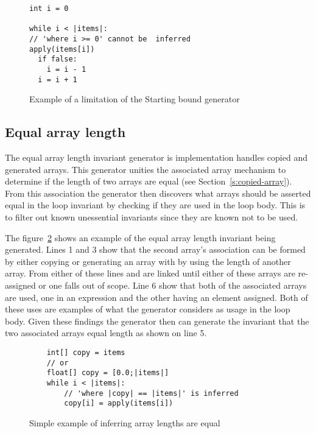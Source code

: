 \begin{figure}[ht]
\begin{lstlisting}
int i = 0

while i < |items|:
// 'where i >= 0' cannot be  inferred
apply(items[i])
  if false:
    i = i - 1
  i = i + 1
\end{lstlisting}
\caption{Example of a limitation of the Starting bound generator}
\label{lst:whiley-start-limit}
\end{figure}

\subsection{Equal array length}


The equal array length invariant generator is implementation handles copied and
generated arrays.
This generator unities the associated array mechanism to determine if the
length of two arrays are equal (see Section~\ref{s:copied-array}).
From this association the generator then discovers what arrays should
be asserted equal in the loop invariant by checking if they are used in the
loop body.
This is to filter out known unessential invariants since they are known not to
be used.

The figure~\ref{lst:whiley-length} shows an example of the equal array length
invariant being generated.
Lines 1 and 3 show that the second array's association can be formed by either
copying or generating an array with by using the length of another array.
From either of these lines  and  are linked until
either of these arrays are re-assigned or one falls out of scope.
Line 6 show that both of the associated arrays are used, one in an expression
and the other having an element assigned.
Both of these uses are examples of what the generator considers as usage in
the loop body.
Given these findings the generator then can generate the invariant that
the two associated arrays equal length as shown on line 5.

\begin{figure}
\begin{lstlisting}
    int[] copy = items
    // or
    float[] copy = [0.0;|items|]
    while i < |items|:
        // 'where |copy| == |items|' is inferred
        copy[i] = apply(items[i])
\end{lstlisting}
\caption{Simple example of inferring array lengths are equal}
\label{lst:whiley-length}
\end{figure}

